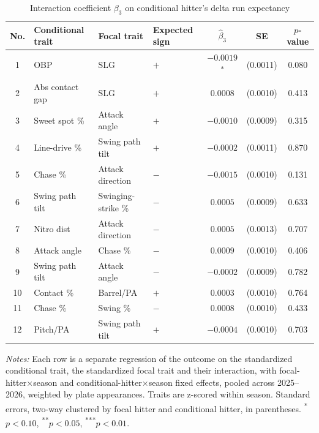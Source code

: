 \begin{table}[htbp]
\centering
\small
\caption{Interaction coefficient $\beta_3$ on conditional hitter's delta run expectancy}
\label{tab:table1_cond_pooled}
\begin{tabular}{clllccc}
\toprule
No. & Conditional trait & Focal trait & Expected sign & $\hat\beta_3$ & SE & $p$-value \\
\midrule
1 & OBP & SLG & $+$ & $-0.0019$\textsuperscript{*} & (0.0011) & 0.080 \\
2 & Abs contact gap & SLG & $+$ & $0.0008$ & (0.0010) & 0.413 \\
3 & Sweet spot \% & Attack angle & $+$ & $-0.0010$ & (0.0009) & 0.315 \\
4 & Line-drive \% & Swing path tilt & $+$ & $-0.0002$ & (0.0011) & 0.870 \\
5 & Chase \% & Attack direction & $-$ & $-0.0015$ & (0.0010) & 0.131 \\
6 & Swing path tilt & Swinging-strike \% & $-$ & $0.0005$ & (0.0009) & 0.633 \\
7 & Nitro dist & Attack direction & $-$ & $0.0005$ & (0.0013) & 0.707 \\
8 & Attack angle & Chase \% & $-$ & $0.0009$ & (0.0010) & 0.406 \\
9 & Swing path tilt & Attack angle & $-$ & $-0.0002$ & (0.0009) & 0.782 \\
10 & Contact \% & Barrel/PA & $+$ & $0.0003$ & (0.0010) & 0.764 \\
11 & Chase \% & Swing \% & $-$ & $0.0008$ & (0.0010) & 0.433 \\
12 & Pitch/PA & Swing path tilt & $+$ & $-0.0004$ & (0.0010) & 0.703 \\
\bottomrule
\end{tabular}
\par\smallskip\parbox{0.95\textwidth}{\footnotesize \textit{Notes:} Each row is a separate regression of the outcome on the standardized conditional trait, the standardized focal trait and their interaction, with focal-hitter$\times$season and conditional-hitter$\times$season fixed effects, pooled across 2025--2026, weighted by plate appearances. Traits are z-scored within season. Standard errors, two-way clustered by focal hitter and conditional hitter, in parentheses. \textsuperscript{*}$p<0.10$, \textsuperscript{**}$p<0.05$, \textsuperscript{***}$p<0.01$.}
\end{table}
